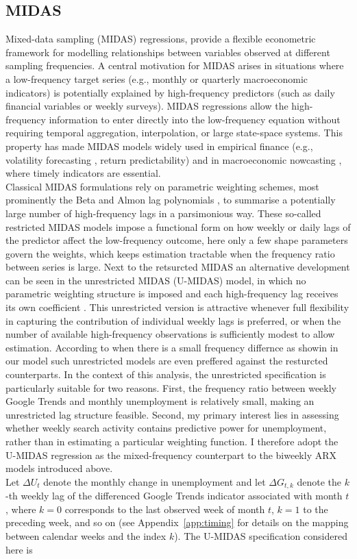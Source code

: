 \documentclass[12pt,a4paper]{article}
\begin{document}
\subsection{MIDAS}
Mixed-data sampling (MIDAS) regressions, provide a flexible econometric framework for modelling relationships between variables observed at different sampling frequencies. A central motivation for MIDAS arises in situations where a low-frequency target series (e.g., monthly or quarterly macroeconomic indicators) is potentially explained by high-frequency predictors (such as daily financial variables or weekly surveys). MIDAS regressions allow the high-frequency information to enter directly into the low-frequency equation without requiring temporal aggregation, interpolation, or large state-space systems. This property has made MIDAS models widely used in empirical finance (e.g., volatility forecasting \citet{ghysels}, return predictability) and in macroeconomic nowcasting \citep{clements2008macroeconomic}, where timely indicators are essential.\\
Classical MIDAS formulations rely on parametric weighting schemes, most prominently the Beta and Almon lag polynomials \citep{ghysels, ghysel2}, to summarise a potentially large number of high-frequency lags in a parsimonious way. These so-called restricted MIDAS models impose a functional form on how weekly or daily lags of the predictor affect the low-frequency outcome, here only a few shape parameters govern the weights, which keeps estimation tractable when the frequency ratio between series is large.
Next to the retsurcted MIDAS an alternative  development can be seen in the unrestricted MIDAS (U-MIDAS) model, in which no parametric weighting structure is imposed and each high-frequency lag receives its own coefficient \citep{foroni2015unrestricted}. This unrestricted version is 
attractive whenever full flexibility in capturing the contribution of individual weekly lags is preferred, or when the number of available high-frequency observations is sufficiently modest to allow estimation.
According to \citet{foroni2015unrestricted} when there is a small frequency differnce as showin in our model such unrestricted models are even preffered against the resturcted counterparts.
In the context of this analysis, the unrestricted specification is particularly suitable for two reasons. First, the frequency ratio between weekly Google Trends and monthly unemployment is relatively small, making an unrestricted lag structure feasible. Second, my primary interest lies in assessing whether weekly search activity contains predictive power for unemployment, rather than in estimating a particular weighting function. I therefore adopt the U-MIDAS regression as the mixed-frequency counterpart to the biweekly ARX models introduced above.\\
Let $\Delta U_t$ denote the monthly change in unemployment and let $\Delta G_{t,k}$ denote the $k$-th weekly lag of the differenced Google Trends indicator associated with month $t$, where $k=0$ corresponds to the last observed week of month $t$, $k=1$ to the preceding week, and so on (see Appendix~\ref{app:timing} for details on the mapping between calendar weeks and the index $k$). The U-MIDAS specification considered here is
\end{document}
